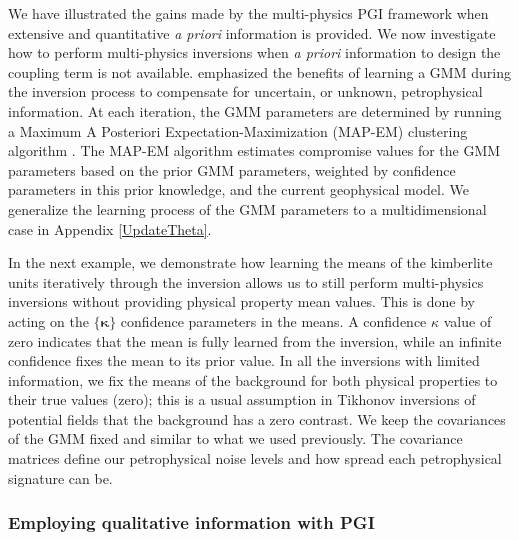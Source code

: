 \documentclass[extra, mreferee]{gji_joint} %
\begin{document}
We have illustrated the gains made by the multi-physics PGI framework when extensive and quantitative \textit{a priori} information is provided. We now investigate how to perform multi-physics inversions when \textit{a priori} information to design the coupling term is not available. \citet{ggz389} emphasized the benefits of learning a GMM during the inversion process to compensate for uncertain, or unknown, petrophysical information. At each iteration, the GMM parameters are determined by running a Maximum A Posteriori Expectation-Maximization (MAP-EM) clustering algorithm \citep{ExpectationMaximization}. The MAP-EM algorithm estimates compromise values for the GMM parameters based on the prior GMM parameters, weighted by confidence parameters in this prior knowledge, and the current geophysical model. We generalize the learning process of the GMM parameters to a multidimensional case in Appendix \ref{UpdateTheta}.

In the next example, we demonstrate how learning the means of the kimberlite units iteratively through the inversion allows us to still perform multi-physics inversions without providing physical property mean values. This is done by acting on the $\{\mathbf{\kappa}\}$ confidence parameters in the means. A confidence $\kappa$ value of zero indicates that the mean is fully learned from the inversion, while an infinite confidence fixes the mean to its prior value. In all the inversions with limited information, we fix the means of the background for both physical properties to their true values (zero); this is a usual assumption in Tikhonov inversions of potential fields that the background has a zero contrast. We keep the covariances of the GMM fixed and similar to what we used previously. The covariance matrices define our petrophysical noise levels and how spread each petrophysical signature can be.

\subsubsection{Employing qualitative information with PGI} \label{sec:InterpreterAssumption}
\end{document}
